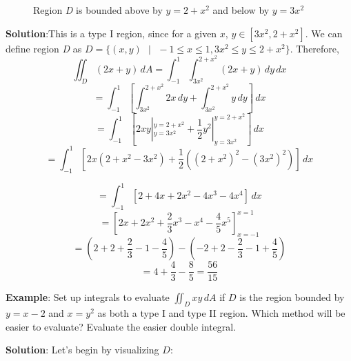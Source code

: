 \begin{figure}[htbp]
\centering
    \caption{Region \textit{D} is bounded above by $y = 2 + x^2$ and below by 
    $y = 3x^2$}
    \label{fig:parabola}
\end{figure}


\textbf{Solution}:This is a type I region, since for a given $x$, $y \in \left[
3x^2, 2 + x^2 \right]$. We can define region \textit{D} as $\textit{D} = \{(x, 
y) \text{ }|\text{ } -1 \leq x \leq 1, 3x^2 \leq y \leq 2 + x^2 \}$. Therefore, 
$$\iint_{\textit{D}} (2x + y)\,dA = \int_{-1}^1 \int_{3x^2}^{2 + x^2} \left(2x 
+ y \right)\,dy\,dx$$
$$= \int_{-1}^1 \left[ \int_{3x^2}^{2 + x^2} 2x\,dy + \int_{3x^2}^{2 + x^2} y
\,dy \right]\,dx$$
$$= \int_{-1}^{1} \left[ 2xy|_{y = 3x^2}^{y = 2 + x^2} + \frac{1}{2}y^2|_{y = 
3x^2}^{y = 2+x^2} \right]\,dx$$
$$= \int_{-1}^1 \left[ 2x \left( 2 + x^2 - 3x^2 \right) + \frac{1}{2} \left( 
(2 + x^2)^2 - (3x^2)^2 \right) \right]\,dx$$

$$= \int_{-1}^1 \left[ 2 + 4x + 2x^2 - 4x^3 - 4x^4 \right]\,dx$$
$$= \left[ 2x + 2x^2 + \frac{2}{3}x^3 - x^4 - \frac{4}{5}x^5 \right]_{x = -1}^{
x = 1}$$
$$= \left( 2 + 2 + \frac{2}{3} - 1 - \frac{4}{5} \right) - \left( -2 + 2 - 
\frac{2}{3} - 1 + \frac{4}{5} \right)$$
$$= 4 + \frac{4}{3} - \frac{8}{5} = \frac{56}{15}$$

\textbf{Example}: Set up integrals to evaluate $\iint_{D} xy\,dA$ if $D$ is 
the region bounded by $y = x - 2$ and $x = y^2$ as both a type I and type II 
region. Which method will be easier to evaluate? Evaluate the easier double 
integral. 

\textbf{Solution}: Let's begin by visualizing $D$:

